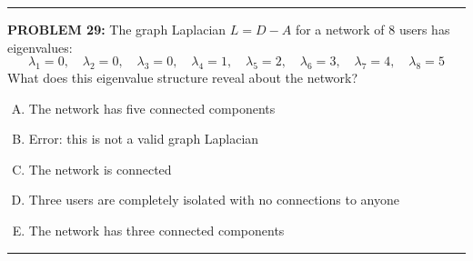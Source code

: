\documentclass[12pt]{amsart}
\newcommand{\divider}{
  \vspace{-1em} %
  \noindent
  \raisebox{-0.15ex}{\textbullet}%
  \hspace{0.5em}%
  \rule[0.5ex]{0.95\textwidth}{1.0pt}%
  \hspace{0.5em}%
  \raisebox{-0.15ex}{\textbullet}%
  \vspace{0em} %
}
\begin{document}
{\divider




\newpage

{\bf PROBLEM 29:}
% 
The graph Laplacian $L = D - A$ for a network of 8 users has eigenvalues:
$$\lambda_1 = 0, \quad \lambda_2 = 0, \quad \lambda_3 = 0, \quad \lambda_4 = 1, \quad \lambda_5 = 2, \quad \lambda_6 = 3, \quad \lambda_7 = 4, \quad \lambda_8 = 5$$
What does this eigenvalue structure reveal about the network?

\begin{enumerate}[(A)]
\item The network has five connected components
\item Error: this is not a valid graph Laplacian
\item The network is connected
\item Three users are completely isolated with no connections to anyone
\item The network has three connected components
\end{enumerate}


\divider

}
\end{document}
